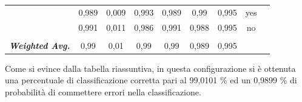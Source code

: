 \begin{table}[htbp]
{\begin{tabular}{rrrrrrrrr}
		\multicolumn{1}{c}{} & \multicolumn{1}{c}{0,989} & \multicolumn{1}{c}{0,009} & \multicolumn{1}{c}{0,993} & \multicolumn{1}{c}{0,989} & \multicolumn{1}{c}{0,99} & \multicolumn{1}{c}{0,995} & \multicolumn{1}{c}{yes} &  \\
		\multicolumn{1}{c}{} & \multicolumn{1}{c}{0,991} & \multicolumn{1}{c}{0,011} & \multicolumn{1}{c}{0,986} & \multicolumn{1}{c}{0,991} & \multicolumn{1}{c}{0,988} & \multicolumn{1}{c}{0,995} & \multicolumn{1}{c}{no} &  \\
		\multicolumn{1}{c}{} & \multicolumn{1}{c}{} & \multicolumn{1}{c}{} & \multicolumn{1}{c}{} & \multicolumn{1}{c}{} & \multicolumn{1}{c}{} & \multicolumn{1}{c}{} & \multicolumn{1}{c}{} &  \\
		\multicolumn{1}{c}{\textit{\textbf{Weighted Avg.}}} & \multicolumn{1}{c}{0,99} & \multicolumn{1}{c}{0,01} & \multicolumn{1}{c}{0,99} & \multicolumn{1}{c}{0,99} & \multicolumn{1}{c}{0,989} & \multicolumn{1}{c}{0,995} & \multicolumn{1}{c}{} &  \\
		\end{tabular}%
	}
	\label{tab:FTExtendFiltered}%
\end{table}%

Come si evince dalla tabella riassuntiva, in questa configurazione si è ottenuta una percentuale di classificazione corretta pari al 99,0101 \% ed un 0,9899 \% di probabilità di commettere errori nella classificazione.